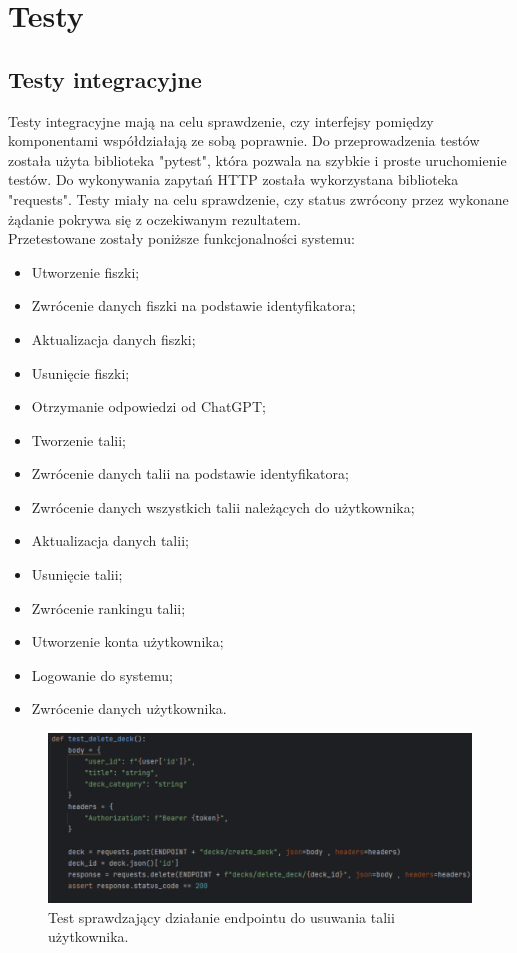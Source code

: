 \chapter{Testy}

\section{Testy integracyjne}

Testy integracyjne mają na celu sprawdzenie, czy interfejsy pomiędzy komponentami współdziałają ze sobą poprawnie.\cite{mielnikIntegrationTests} Do przeprowadzenia testów została użyta biblioteka "pytest", która pozwala na szybkie i proste uruchomienie testów.\cite{oliveira2018} Do wykonywania zapytań HTTP została wykorzystana biblioteka "requests". Testy miały na celu sprawdzenie, czy status zwrócony przez wykonane żądanie pokrywa się z oczekiwanym rezultatem.\\
Przetestowane zostały poniższe funkcjonalności systemu:

\begin{itemize}
    \item Utworzenie fiszki;
    \item Zwrócenie danych fiszki na podstawie identyfikatora;
    \item Aktualizacja danych fiszki;
    \item Usunięcie fiszki;
    \item Otrzymanie odpowiedzi od ChatGPT;
    \item Tworzenie talii;
    \item Zwrócenie danych talii na podstawie identyfikatora;
    \item Zwrócenie danych wszystkich talii należących do użytkownika;
    \item Aktualizacja danych talii;
    \item Usunięcie talii;
    \item Zwrócenie rankingu talii;
    \item Utworzenie konta użytkownika;
    \item Logowanie do systemu;
    \item Zwrócenie danych użytkownika.
\end{itemize}

\begin{figure}[H]
    \centering
    \includegraphics[width=1\textwidth]{chapters/chapter_9/testy1}
    \caption{Test sprawdzający działanie endpointu do usuwania talii użytkownika.}
    \label{img:testy}
\end{figure}

